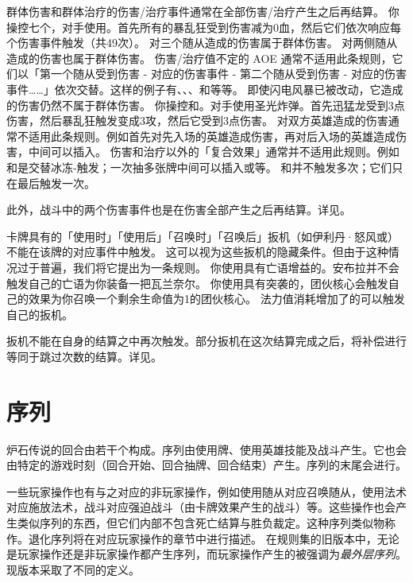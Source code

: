 群体伤害和群体治疗的伤害/治疗事件通常在全部伤害/治疗产生之后再结算。
\example 你操控七个，对手使用。首先所有的暴乱狂受到伤害减为0血，然后它们依次响应每个伤害事件触发（共49次）。
\notice {}对三个随从造成的伤害属于群体伤害。
\notice {}对两侧随从造成的伤害也属于群体伤害。
\notice 伤害/治疗值不定的 AOE 通常不适用此条规则，它们以「第一个随从受到伤害 - 对应的伤害事件 - 第二个随从受到伤害 - 对应的伤害事件……」依次交替。这样的例子有、、、和等等。
\exception 即使闪电风暴已被改动，它造成的伤害仍然不属于群体伤害。
\example 你操控和。对手使用圣光炸弹。首先迅猛龙受到3点伤害，然后暴乱狂触发变成3攻，然后它受到3点伤害。
\notice 对双方英雄造成的伤害通常不适用此条规则。例如首先对先入场的英雄造成伤害，再对后入场的英雄造成伤害，中间可以插入。
\notice 伤害和治疗以外的「复合效果」通常并不适用此规则。例如和是交替冰冻-触发；一次抽多张牌中间可以插入或等。
\notice {}和并不触发多次；它们只在最后触发一次。

此外，战斗中的两个伤害事件也是在伤害全部产生之后再结算。详见。

卡牌具有的「使用时」「使用后」「召唤时」「召唤后」扳机（如伊利丹·怒风或）不能在该牌的对应事件中触发。
\notice 这可以视为这些扳机的隐藏条件。但由于这种情况过于普遍，我们将它提出为一条规则。
\example 你使用具有亡语增益的。安布拉并不会触发自己的亡语为你装备一把瓦兰奈尔。
\exception 你使用具有突袭的，团伙核心会触发自己的效果为你召唤一个剩余生命值为1的团伙核心。
\exception 法力值消耗增加了的可以触发自己的扳机。

扳机不能在自身的结算之中再次触发。部分扳机在这次结算完成之后，将补偿进行等同于跳过次数的结算。详见。

\section{序列}
\label{sequence}

炉石传说的回合由若干个构成。序列由使用牌、使用英雄技能及战斗产生。它也会由特定的游戏时刻（回合开始、回合抽牌、回合结束）产生。序列的末尾会进行。

一些玩家操作也有与之对应的非玩家操作，例如使用随从对应召唤随从，使用法术对应施放法术，战斗对应强迫战斗（由卡牌效果产生的战斗）等。这些操作也会产生类似序列的东西，但它们内部不包含死亡结算与胜负裁定。这种序列类似物称作。退化序列将在对应玩家操作的章节中进行描述。
\notice 在规则集的旧版本中，无论是玩家操作还是非玩家操作都产生序列，而玩家操作产生的被强调为\emph{最外层序列}。现版本采取了不同的定义。


